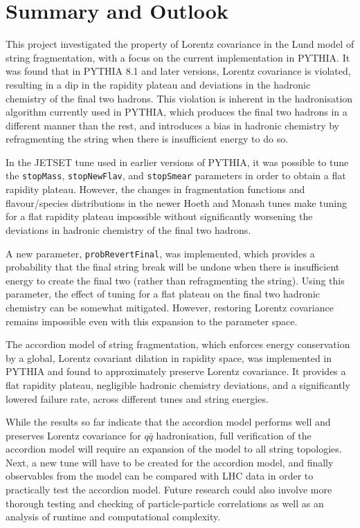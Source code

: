 \documentclass[12pt,a4paper]{report}
\begin{document}
\chapter{Summary and Outlook}
This project investigated the property of Lorentz covariance in the Lund model of string fragmentation, with a focus on the current implementation in PYTHIA. It was found that in PYTHIA 8.1 and later versions, Lorentz covariance is violated, resulting in a dip in the rapidity plateau and deviations in the hadronic chemistry of the final two hadrons. This violation is inherent in the hadronisation algorithm currently used in PYTHIA, which produces the final two hadrons in a different manner than the rest, and introduces a bias in hadronic chemistry by refragmenting the string when there is insufficient energy to do so.

In the JETSET tune used in earlier versions of PYTHIA, it was possible to tune the \texttt{stopMass}, \texttt{stopNewFlav}, and \texttt{stopSmear} parameters in order to obtain a flat rapidity plateau. However, the changes in fragmentation functions and flavour/species distributions in the newer Hoeth and Monash tunes make tuning for a flat rapidity plateau impossible without significantly worsening the deviations in hadronic chemistry of the final two hadrons.

A new parameter, \texttt{probRevertFinal}, was implemented, which provides a probability that the final string break will be undone when there is insufficient energy to create the final two (rather than refragmenting the string). Using this parameter, the effect of tuning for a flat plateau on the final two hadronic chemistry can be somewhat mitigated. However, restoring Lorentz covariance remains impossible even with this expansion to the parameter space.

The accordion model of string fragmentation, which enforces energy conservation by a global, Lorentz covariant dilation in rapidity space, was implemented in PYTHIA and found to approximately preserve Lorentz covariance. It provides a flat rapidity plateau, negligible hadronic chemistry deviations, and a significantly lowered failure rate, across different tunes and string energies.

While the results so far indicate that the accordion model performs well and preserves Lorentz covariance for $q\bar{q}$ hadronisation, full verification of the accordion model will require an expansion of the model to all string topologies. Next, a new tune will have to be created for the accordion model, and finally observables from the model can be compared with LHC data in order to practically test the accordion model. Future research could also involve more thorough testing and checking of particle-particle correlations as well as an analysis of runtime and computational complexity.
\end{document}
